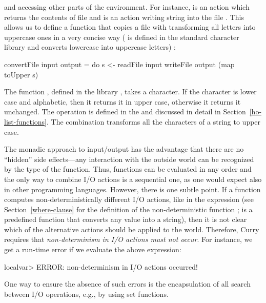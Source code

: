 and accessing other parts of the environment.
For instance, 
is an action which returns the contents
of file  and 
is an action writing string
 into the file . This allows us to define a function
that copies a file with transforming all letters into uppercase ones
in a very concise way (
is defined in the standard character library  and converts
lowercase into uppercase letters)
:
\begin{curry}
convertFile input output = do
  s <- readFile input
  writeFile output (map toUpper s)
\end{curry}
%
% 
The function , defined in the library ,
takes a character. If the character is lower case and alphabetic,
then it returns it in upper case, otherwise it returns it unchanged.
The operation  is defined in the 
and discussed in detail in Section~\ref{ho-list-functions}.
The combination  transforms all the characters
of a string to upper case.

The monadic approach to input/output has the advantage
that there are no ``hidden'' side effects---any interaction
with the outside world can be recognized by the  type of the
function. Thus, functions can be evaluated in any order
and the only way to combine I/O actions is a sequential one, as
one would expect also in other programming languages.
However, there is one subtle point. If a function computes
non-deterministically different I/O actions,
like in the expression 
(see Section~\ref{where-clause} for the definition
of the non-deterministic function ;
 is a predefined function that
converts any value into a string),
then it is not clear which of the alternative actions
should be applied to the world. Therefore, Curry requires
that \emph{non-determinism in I/O actions must not occur}.
For instance, we get a run-time error if we evaluate the
above expression:
\begin{prog}
localvar> 
ERROR: non-determinism in I/O actions occurred!
\end{prog}
%
One way to ensure the absence of such errors is the
encapsulation of all search between I/O operations, e.g.,
by using set functions.

